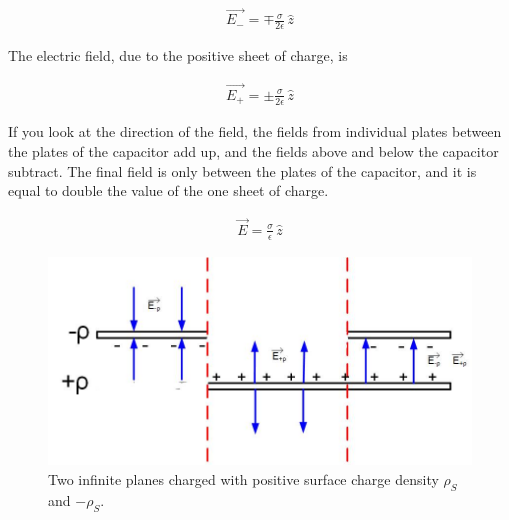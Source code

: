 \documentclass{ximera}
\begin{document}
\begin{eqnarray}
 \vec{E_-}  = \mp \frac{\sigma}{2 \epsilon } \, \hat{z}
\end{eqnarray}

The electric field, due to the positive sheet of charge, is


\begin{eqnarray}
 \vec{E_+}  = \pm \frac{\sigma}{2 \epsilon } \, \hat{z}
\end{eqnarray}

If you look at the direction of the field, the fields from individual plates between the plates of the capacitor add up, and the fields above and below the capacitor subtract. The final field is only between the plates of the capacitor, and it is equal to double the value of the one sheet of charge.




\begin{eqnarray}
 \vec{E}  = \frac{\sigma}{ \epsilon } \, \hat{z}
\end{eqnarray}


\begin{figure}[htbp]
\begin{center}
\includegraphics[scale=0.65]{../jpg/Infinite_Parallel_Plates1.jpg}
\end{center}
\caption{Two infinite planes charged with positive surface charge density $\rho_S$ and $-\rho_S.$}
\label{Gaus2Plane}
\end{figure}
\end{document}

